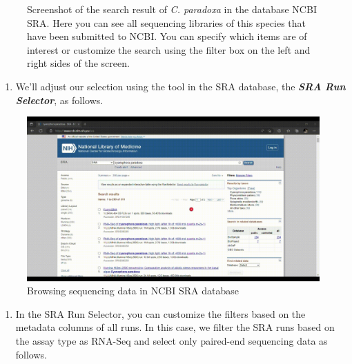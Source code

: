 \documentclass[
  letterpaper,
  DIV=11,
  numbers=noendperiod]{scrreprt}
\providecommand{\tightlist}{%
  \setlength{\itemsep}{0pt}\setlength{\parskip}{0pt}}\usepackage{longtable,booktabs,array}
\begin{document}
\begin{tcolorbox}
\begin{figure}[H]
{}

\caption{Screenshot of the search result of \emph{C. paradoxa} in the
database NCBI SRA. Here you can see all sequencing libraries of this
species that have been submitted to NCBI. You can specify which items
are of interest or customize the search using the filter box on the left
and right sides of the screen.}

\end{figure}

\begin{enumerate}
\def\labelenumi{\arabic{enumi}.}
\setcounter{enumi}{1}
\tightlist
\item
  We'll adjust our selection using the tool in the SRA database, the
  \textbf{\emph{SRA Run Selector}}, as follows.
\end{enumerate}

\begin{figure}[H]

{\centering \includegraphics{./assets/15_run_selector.gif}

}

\caption{Browsing sequencing data in NCBI SRA database}

\end{figure}

\begin{enumerate}
\def\labelenumi{\arabic{enumi}.}
\setcounter{enumi}{2}
\tightlist
\item
  In the SRA Run Selector, you can customize the filters based on the
  metadata columns of all runs. In this case, we filter the SRA runs
  based on the assay type as RNA-Seq and select only paired-end
  sequencing data as follows.
\end{enumerate}

\begin{figure}[H]


\end{figure}
\end{tcolorbox}
\end{document}
